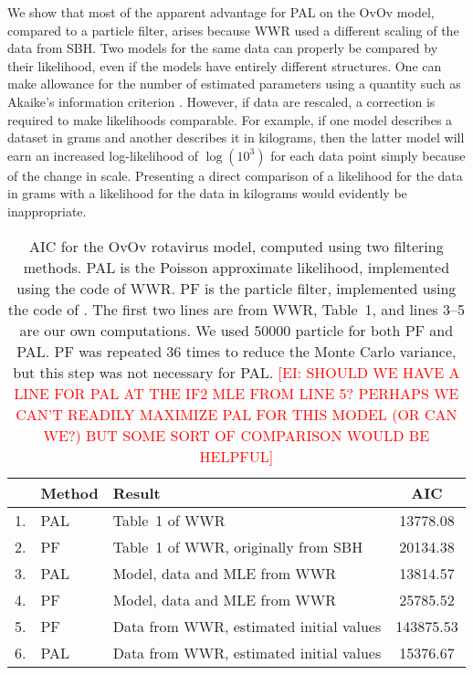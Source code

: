 \documentclass[10pt]{article}\usepackage[]{graphicx}\usepackage[]{xcolor}
\newcommand{\ed}[1]{\textcolor{red}{[EI: #1]}}
\begin{document}
We show that most of the apparent advantage for PAL on the OvOv model, compared to a particle filter, arises because WWR used a different scaling of the data from SBH.
Two models for the same data can properly be compared by their likelihood, even if the models have entirely different structures.
One can make allowance for the number of estimated parameters using a quantity such as Akaike's information criterion \citep{Akaike1974ANL}.
However, if data are rescaled, a correction is required to make likelihoods comparable.
For example, if one model describes a dataset in grams and another describes it in kilograms, then the latter model will earn an increased log-likelihood of $\log(10^3)$ for each data point simply because of the change in scale.
Presenting a direct comparison of a likelihood for the data in grams with a likelihood for the data in kilograms would evidently be inappropriate.


















\begin{table}[ht] %
\centering %
\caption{AIC for the OvOv rotavirus model, computed using two filtering methods. PAL is the Poisson approximate likelihood, implemented using the code of WWR. PF is the particle filter, implemented using the code of \citet{pomppackagepaper}. The first two lines are from WWR, Table~1, and lines 3--5 are our own computations. We used 50000 particle for both PF and PAL. PF was repeated 36 times to reduce the Monte Carlo variance, but this step was not necessary for PAL.
\ed{SHOULD WE HAVE A LINE FOR PAL AT THE IF2 MLE FROM LINE 5? PERHAPS WE CAN'T READILY MAXIMIZE PAL FOR THIS MODEL (OR CAN WE?) BUT SOME SORT OF COMPARISON WOULD BE HELPFUL}
} 
\label{tab:ovovrealdata} %
\begin{tabular}{lllc} 
  \hline
  & Method & Result & AIC  \\
  \hline
  1. & PAL & Table~1 of WWR & 13778.08
  \\
  2. & PF & Table~1 of WWR, originally from SBH &  20134.38
  \\
  3. & PAL & Model, data and MLE from WWR &
    13814.57 
  \\
  4. & PF & Model, data and MLE from WWR &
    25785.52
  \\
  5. & PF & Data from WWR, estimated initial values &
     143875.53
  \\
  6. & PAL & Data from WWR, estimated initial values &
     15376.67
  \\
 \hline
\end{tabular}
\end{table}
 
\end{document}
